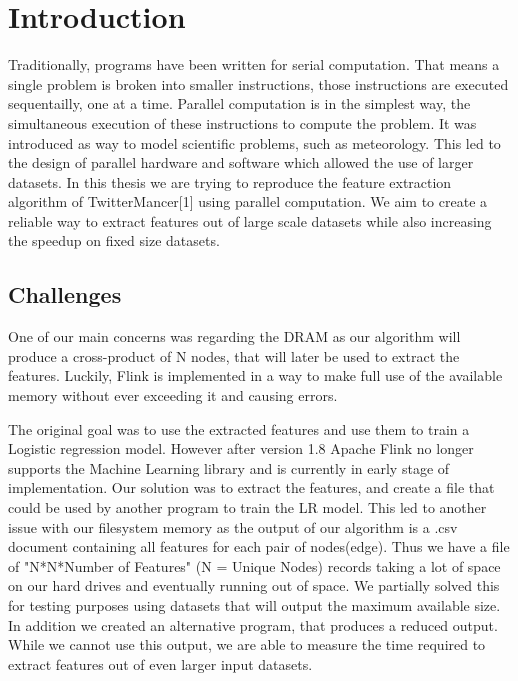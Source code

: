 \chapter{Introduction}


Traditionally, programs have been written for serial computation. That means a single problem is broken into smaller instructions, those instructions are executed sequentailly, one at a time. Parallel computation is in the simplest way, the simultaneous execution of these instructions to compute the problem. It was introduced as way to model scientific problems, such as meteorology. This led to the design of parallel hardware and software which allowed the use of larger datasets. In this thesis we are trying to reproduce the feature extraction algorithm of TwitterMancer[1] using parallel computation. We aim to create a reliable way to extract features out of large scale datasets while also increasing the speedup on fixed size datasets.


\section{Challenges}


One of our main concerns was regarding the DRAM as our algorithm will produce a cross-product of N nodes, that will later be used to extract the features. Luckily, Flink is implemented in a way to make full use of the available memory without ever exceeding it and causing errors. 

The original goal was to use the extracted features and use them to train a Logistic regression model. However after version 1.8 Apache Flink no longer supports the Machine Learning library and is currently in early stage of implementation. Our solution was to extract the features, and create a file that could be used by another program to train the LR model. This led to another issue with our filesystem memory as the output of our algorithm is a .csv document containing all features for each pair of nodes(edge). Thus we have a file of "N*N*Number of Features" (N = Unique Nodes) records taking a lot of space on our hard drives and eventually running out of space. We partially solved this for testing purposes using datasets that will output the maximum available size. In addition we created an alternative program, that produces a reduced output. While we cannot use this output, we are able to measure the time required to extract features out of even larger input datasets.